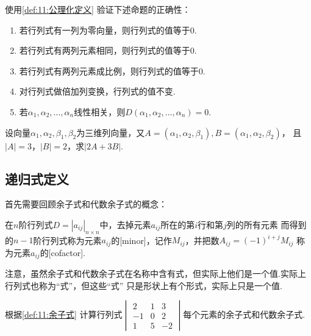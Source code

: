 \begin{example} \label{ex:11:公理化定义}
    使用\autoref{def:11:公理化定义} 验证下述命题的正确性：
    \begin{enumerate}
        \item 若行列式有一列为零向量，则行列式的值等于0.

        \item 若行列式有两列元素相同，则行列式的值等于0.

        \item 若行列式有两列元素成比例，则行列式的值等于0.

        \item 对行列式做倍加列变换，行列式的值不变.

        \item 若$\alpha_1,\alpha_2,\ldots,\alpha_n$线性相关，则$D(\alpha_1,\alpha_2,\ldots,\alpha_n)=0$.
    \end{enumerate}
\end{example}

\begin{example} \label{ex:11:公理化定义2}
    设向量$\alpha_1,\alpha_2,\beta_1,\beta_2$为三维列向量，又$A=(\alpha_1,\alpha_2,\beta_1),B=(\alpha_1,\alpha_2,\beta_2)$，
    且$|A|=3$，$|B|=2$，求$|2A+3B|$.
\end{example}

\subsection{递归式定义}
首先需要回顾余子式和代数余子式的概念：
\begin{definition} \label{def:11:余子式}
    在$n$阶行列式$D=|a_{ij}|_{n \times n}$中，去掉元素$a_{ij}$所在的第$i$行和第$j$列的所有元素
    而得到的$n-1$阶行列式称为元素$a_{ij}$的[minor]，记作$M_{ij}$，并把数$A_{ij}=(-1)^{i+j}M_{ij}$
    称为元素$a_{ij}$的[cofactor].
\end{definition}
注意，虽然余子式和代数余子式在名称中含有式，但实际上他们是一个值.实际上行列式也称为``式''，但这些``式''
只是形状上有个形式，实际上只是一个值.
\begin{example} \label{ex:11:cofactor}
    根据\autoref{def:11:余子式} 计算行列式$\begin{vmatrix}
        2 & 1 & 3 \\
        -1 & 0 & 2 \\
        1 & 5 & -2
    \end{vmatrix}$每个元素的余子式和代数余子式.
\end{example}

